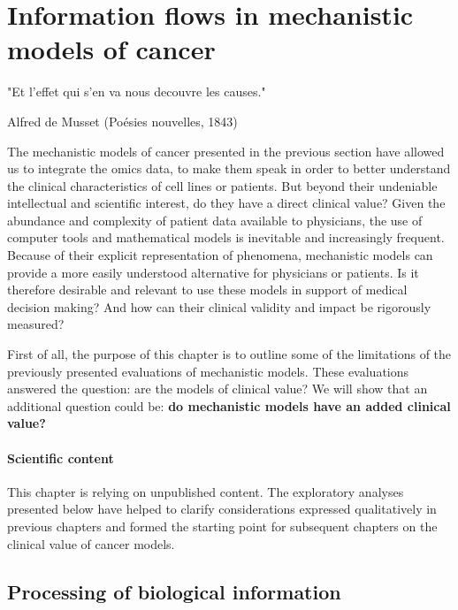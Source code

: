 \documentclass[a4paper,12pt,twoside,onecolumn,openright,final,oldfontcommands]{memoir}
\newcommand{\initial}[1]{
	\lettrine[lines=3,lhang=0.33,nindent=0em]{
		\color{gray}
     		{\textsc{#1}}}{}}
\let\BeginKnitrBlock\begin \let\EndKnitrBlock\end
\begin{document}
\chapter{Information flows in mechanistic models of
cancer}\label{information-flows-in-mechanistic-models-of-cancer}

\epigraph{"Et l'effet qui s'en va nous decouvre les causes."}{Alfred de Musset (Poésies nouvelles, 1843)}

\initial{T}he mechanistic models of cancer presented in the previous
section have allowed us to integrate the omics data, to make them speak
in order to better understand the clinical characteristics of cell lines
or patients. But beyond their undeniable intellectual and scientific
interest, do they have a direct clinical value? Given the abundance and
complexity of patient data available to physicians, the use of computer
tools and mathematical models is inevitable and increasingly frequent.
Because of their explicit representation of phenomena, mechanistic
models can provide a more easily understood alternative for physicians
or patients. Is it therefore desirable and relevant to use these models
in support of medical decision making? And how can their clinical
validity and impact be rigorously measured?

First of all, the purpose of this chapter is to outline some of the
limitations of the previously presented evaluations of mechanistic
models. These evaluations answered the question: are the models of
clinical value? We will show that an additional question could be:
\textbf{do mechanistic models have an added clinical value?}

\BeginKnitrBlock{summarybox}
\subsubsection*{Scientific content}\label{scientific-content-4}

This chapter is relying on unpublished content. The exploratory analyses
presented below have helped to clarify considerations expressed
qualitatively in previous chapters and formed the starting point for
subsequent chapters on the clinical value of cancer models.
\EndKnitrBlock{summarybox}

\section{Processing of biological
information}\label{processing-of-biological-information}
\end{document}
